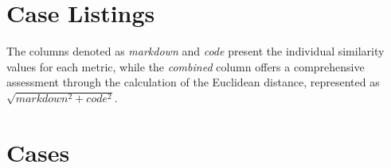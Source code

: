 \documentclass{article}
\begin{document}
\section{Case Listings}\label{sec:cl}
The columns denoted as \textit{markdown} and \textit{code} present the individual similarity values for each metric, while the \textit{combined} column offers a comprehensive assessment through the calculation of the Euclidean distance, represented as $\sqrt{markdown^2 + code^2}$.

\newpage
\section{Cases}
\end{document}

